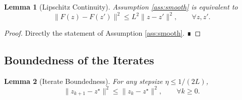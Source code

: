 \documentclass[11pt]{article}
\newtheorem{lemma}{Lemma}[section]
\begin{document}
\begin{lemma}[Lipschitz Continuity]\label{lem:lipschitz}
Assumption \ref{ass:smooth} is equivalent to
\[
\|F(z)-F(z')\|^2\le L^2\|z-z'\|^2,\qquad\forall z,z'.
\]
\end{lemma}
\begin{proof}
Directly the statement of Assumption \ref{ass:smooth}. ∎
\end{proof}

\subsection*{Boundedness of the Iterates}
\begin{lemma}[Iterate Boundedness]\label{lem:boundedness}
For any stepsize $\eta\le 1/(2L)$,
\[
\|z_{k+1}-z^\star\|^2\le \|z_k-z^\star\|^2,
\qquad\forall k\ge0.
\tag{L1}
\]
\end{lemma}
\end{document}
